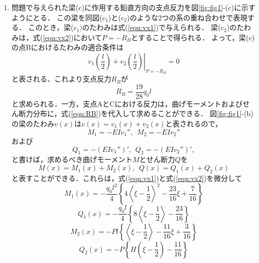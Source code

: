 \documentclass[10pt,a4j]{jarticle}
\begin{document}
\begin{enumerate}
\begin{equation}
	\right\}
		\label{eqn:vx2}
	\end{equation}
が得られる．
\item
問題で与えられた梁(c)に作用する鉛直方向の支点反力を図\ref{fig:fig1}-(c)に示すようにとる．
この梁を同図(c$_1$)と(c$_2$)のような2つの系の重ね合わせで表現する．
このとき，梁(c$_1)$のたわみは式(\ref{eqn:vx1})で与えられる．
梁(c$_2$)のたわみは，式(\ref{eqn:vx2})において$P=-R_B$とすることで得られる．
よって，梁(c)の点Bにおけるたわみの適合条件は
\begin{equation}
	v_1\left( \frac{l}{2}\right) 
	+
	\left. v_2\left( \frac{l}{2}\right)  \right|_{P=-R_B}=0
\end{equation}
と表される．これより支点反力$R_B$が
\begin{equation}
	R_B=\frac{19}{28}q_0l
	\label{eqn:RB}
\end{equation}
と求められる．一方，支点AとCにおける反力は，曲げモーメントおよびせん断力分布に，式(\ref{eqn:RB})を代入して求めることができる．
図\ref{fig:fig1}-(b)の梁のたわみ$v(x)$は$v(x)=v_1(x)+v_2(x)$と表されるので，
\begin{equation}
	M_1=-EIv_1'', \ \ M_2=-EIv_2''
\end{equation}
および
\begin{equation}
	Q_1=-(EIv_1'')', \ \ Q_2=-(EIv_2'')',
\end{equation}
と書けば，求めるべき曲げモーメント$M$とせん断力$Q$を
\begin{equation}
	M(x)=M_1(x)+M_2(x),  \  \
	Q(x)=Q_1(x)+Q_2(x)
\end{equation}
と表すことができる．これらは，式(\ref{eqn:vx1})と式(\ref{eqn:vx2})を微分して
	\begin{equation}
	M_1(x)=-\frac{q_0l^2}{4}\left\{
		4\left< \xi -\frac{1}{2}\right> ^2
		-
		\frac{23}{16}
		\xi
		+
		\frac{7}{16}
	\right\}
		\label{eqn:Mx1}
		\end{equation}
	\begin{equation}
	Q_1(x)=-\frac{q_0l}{4}\left\{
		8\left< \xi -\frac{1}{2}\right> 
		-
		\frac{23}{16}
	\right\}
	\label{eqn:Qx1}
	\end{equation}
	\begin{equation}
	M_2(x)=-Pl\left\{
		\left< \xi -\frac{1}{2}\right> 
			-
			\frac{11}{16} \xi
			+
			\frac{3}{16}
		\right\}
		\label{eqn:Mx2}
		\end{equation}
	\begin{equation}
	Q_2(x)=-P\left\{
		H\left( \xi -\frac{1}{2}\right) 
		-
		\frac{11}{16}
	\right\}
	\label{eqn:Qx2}
	\end{equation}

\end{enumerate}
\end{document}
